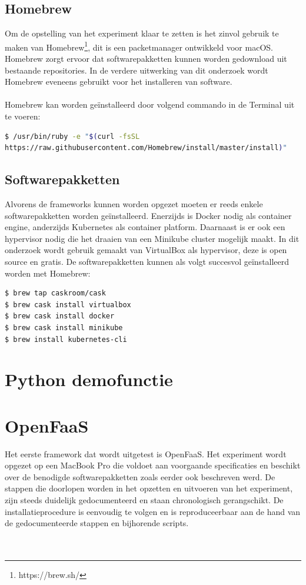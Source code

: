 \subsection{Homebrew}
Om de opstelling van het experiment klaar te zetten is het zinvol gebruik te maken van Homebrew\footnote{https://brew.sh/}, dit is een packetmanager ontwikkeld voor macOS. Homebrew zorgt ervoor dat softwarepakketten kunnen worden gedownload uit bestaande repositories. In de verdere uitwerking van dit onderzoek wordt Homebrew eveneens gebruikt voor het installeren van software.\\\\
Homebrew kan worden geïnstalleerd door volgend commando in de Terminal uit te voeren: 
\begin{lstlisting}[language=bash]
$ /usr/bin/ruby -e "$(curl -fsSL 
https://raw.githubusercontent.com/Homebrew/install/master/install)"
\end{lstlisting}

\subsection{Softwarepakketten}
Alvorens de frameworks kunnen worden opgezet moeten er reeds enkele softwarepakketten worden geïnstalleerd. Enerzijds is Docker nodig als container engine, anderzijds Kubernetes als container platform. Daarnaast is er ook een hypervisor nodig die het draaien van een Minikube cluster mogelijk maakt. In dit onderzoek wordt gebruik gemaakt van VirtualBox als hypervisor, deze is open source en gratis. De softwarepakketten kunnen als volgt succesvol geïnstalleerd worden met Homebrew:        
\begin{lstlisting}[language=bash]
$ brew tap caskroom/cask
$ brew cask install virtualbox
$ brew cask install docker
$ brew cask install minikube
$ brew install kubernetes-cli
\end{lstlisting}

\section{Python demofunctie}

\section{OpenFaaS}
Het eerste framework dat wordt uitgetest is OpenFaaS. Het experiment wordt opgezet op een MacBook Pro die voldoet aan voorgaande specificaties en beschikt over de benodigde softwarepakketten zoals eerder ook beschreven werd. De stappen die doorlopen worden in het opzetten en uitvoeren van het experiment, zijn steeds duidelijk gedocumenteerd en staan chronologisch gerangschikt. De installatieprocedure is eenvoudig te volgen en is reproduceerbaar aan de hand van de gedocumenteerde stappen en bijhorende scripts.
\\\\\\
